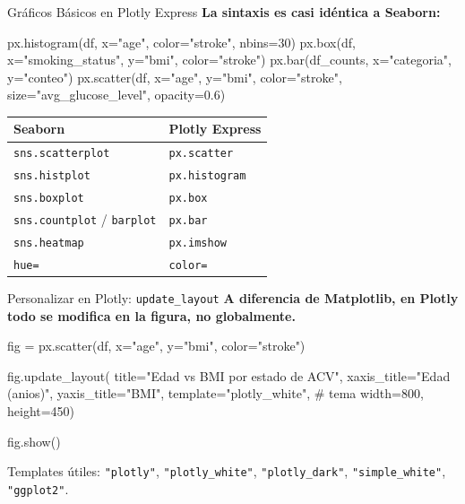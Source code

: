 \documentclass[aspectratio=169, 11pt]{beamer}
\begin{document}
\begin{frame}[fragile,shrink=15]{Gráficos Básicos en Plotly Express}
  \vspace{-6pt}
  {\footnotesize\color{arcaDark}\bfseries
    La sintaxis es casi idéntica a Seaborn:}

  \vspace{4pt}
  \begin{pyblock}
px.histogram(df, x="age", color="stroke", nbins=30)
px.box(df, x="smoking_status", y="bmi", color="stroke")
px.bar(df_counts, x="categoria", y="conteo")
px.scatter(df, x="age", y="bmi", color="stroke",
           size="avg_glucose_level", opacity=0.6)
  \end{pyblock}

  \vspace{6pt}
  {\scriptsize
  \begin{tabular}{@{}ll@{}}
    \toprule
    \textbf{Seaborn} & \textbf{Plotly Express} \\
    \midrule
    \texttt{sns.scatterplot} & \texttt{px.scatter} \\
    \texttt{sns.histplot} & \texttt{px.histogram} \\
    \texttt{sns.boxplot} & \texttt{px.box} \\
    \texttt{sns.countplot} / \texttt{barplot} & \texttt{px.bar} \\
    \texttt{sns.heatmap} & \texttt{px.imshow} \\
    \texttt{hue=} & \texttt{color=} \\
    \bottomrule
  \end{tabular}
  }
\end{frame}

\begin{frame}[fragile,shrink=8]{Personalizar en Plotly: \texttt{update\_layout}}
  \vspace{-4pt}
  {\footnotesize\color{arcaDark}\bfseries
    A diferencia de Matplotlib, en Plotly todo se modifica en la figura,
    no globalmente.}

  \vspace{4pt}
  \begin{pyblock}
fig = px.scatter(df, x="age", y="bmi", color="stroke")

fig.update_layout(
    title="Edad vs BMI por estado de ACV",
    xaxis_title="Edad (anios)",
    yaxis_title="BMI",
    template="plotly_white",   # tema
    width=800, height=450)

fig.show()
  \end{pyblock}

  \vspace{4pt}
  {\scriptsize\color{textMuted}
    Templates útiles: \texttt{"plotly"}, \texttt{"plotly\_white"},
    \texttt{"plotly\_dark"}, \texttt{"simple\_white"}, \texttt{"ggplot2"}.}
\end{frame}
\end{document}

